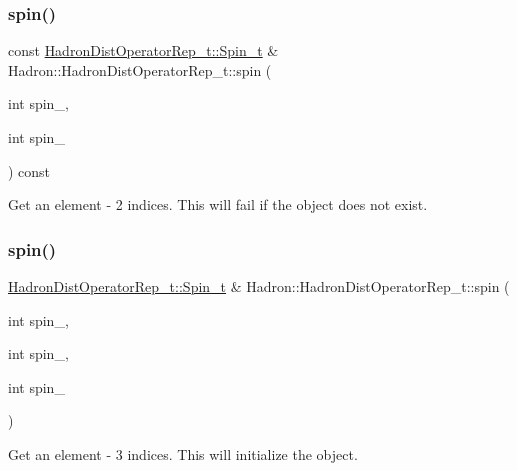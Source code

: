 \subsubsection{\texorpdfstring{spin()}{spin()}\hspace{0.1cm}{\footnotesize\ttfamily [2/8]}}
{\footnotesize\ttfamily const \mbox{\hyperlink{structHadron_1_1HadronDistOperatorRep__t_1_1Spin__t}{Hadron\+Dist\+Operator\+Rep\+\_\+t\+::\+Spin\+\_\+t}} \& Hadron\+::\+Hadron\+Dist\+Operator\+Rep\+\_\+t\+::spin (\begin{DoxyParamCaption}\item[{int}]{spin\+\_,  }\item[{int}]{spin\+\_ }\end{DoxyParamCaption}) const}



Get an element -\/ 2 indices. This will fail if the object does not exist. 

\mbox{\label{classHadron_1_1HadronDistOperatorRep__t_a215985252fdaecbbecab777de4591cd4}} 
\subsubsection{\texorpdfstring{spin()}{spin()}\hspace{0.1cm}{\footnotesize\ttfamily [3/8]}}
{\footnotesize\ttfamily \mbox{\hyperlink{structHadron_1_1HadronDistOperatorRep__t_1_1Spin__t}{Hadron\+Dist\+Operator\+Rep\+\_\+t\+::\+Spin\+\_\+t}} \& Hadron\+::\+Hadron\+Dist\+Operator\+Rep\+\_\+t\+::spin (\begin{DoxyParamCaption}\item[{int}]{spin\+\_,  }\item[{int}]{spin\+\_,  }\item[{int}]{spin\+\_ }\end{DoxyParamCaption})}



Get an element -\/ 3 indices. This will initialize the object. 

\mbox{\label{classHadron_1_1HadronDistOperatorRep__t_a436620dfee9ff1c98febcc5ae7b0ff3a}} 
